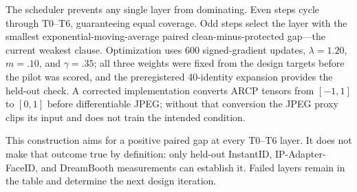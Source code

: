 The scheduler prevents any single layer from dominating. Even steps cycle
through T0--T6, guaranteeing equal coverage. Odd steps select the layer with the
smallest exponential-moving-average paired clean-minus-protected gap---the
current weakest clause.
Optimization uses 600 signed-gradient updates, $\lambda=1.20$, $m=.10$, and
$\gamma=.35$; all three weights were fixed from the design targets before the
pilot was scored, and the preregistered 40-identity expansion provides the
held-out check. A corrected implementation converts ARCP tensors from $[-1,1]$
to $[0,1]$ before differentiable JPEG; without that conversion the JPEG proxy
clips its input and does not train the intended condition.

This construction aims for a positive paired gap at every T0--T6 layer. It does
not make that outcome true by definition: only held-out InstantID,
IP-Adapter-FaceID, and DreamBooth measurements can establish it. Failed layers
remain in the table and determine the next design iteration.
